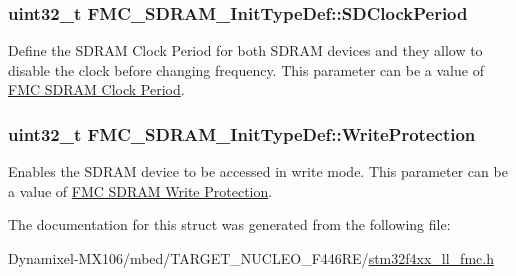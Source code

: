 \subsubsection[{\texorpdfstring{S\+D\+Clock\+Period}{SDClockPeriod}}]{\setlength{\rightskip}{0pt plus 5cm}uint32\+\_\+t F\+M\+C\+\_\+\+S\+D\+R\+A\+M\+\_\+\+Init\+Type\+Def\+::\+S\+D\+Clock\+Period}\hypertarget{struct_f_m_c___s_d_r_a_m___init_type_def_af7845a58e91f2166717b2f7f15d14dbb}{}\label{struct_f_m_c___s_d_r_a_m___init_type_def_af7845a58e91f2166717b2f7f15d14dbb}
Define the S\+D\+R\+AM Clock Period for both S\+D\+R\+AM devices and they allow to disable the clock before changing frequency. This parameter can be a value of \hyperlink{group___f_m_c___s_d_r_a_m___clock___period}{F\+MC S\+D\+R\+AM Clock Period}. 
\subsubsection[{\texorpdfstring{Write\+Protection}{WriteProtection}}]{\setlength{\rightskip}{0pt plus 5cm}uint32\+\_\+t F\+M\+C\+\_\+\+S\+D\+R\+A\+M\+\_\+\+Init\+Type\+Def\+::\+Write\+Protection}\hypertarget{struct_f_m_c___s_d_r_a_m___init_type_def_a5baf22e72bd710a0522b0814723f518d}{}\label{struct_f_m_c___s_d_r_a_m___init_type_def_a5baf22e72bd710a0522b0814723f518d}
Enables the S\+D\+R\+AM device to be accessed in write mode. This parameter can be a value of \hyperlink{group___f_m_c___s_d_r_a_m___write___protection}{F\+MC S\+D\+R\+AM Write Protection}. 

The documentation for this struct was generated from the following file\+:\begin{DoxyCompactItemize}
\item 
Dynamixel-\/\+M\+X106/mbed/\+T\+A\+R\+G\+E\+T\+\_\+\+N\+U\+C\+L\+E\+O\+\_\+\+F446\+R\+E/\hyperlink{stm32f4xx__ll__fmc_8h}{stm32f4xx\+\_\+ll\+\_\+fmc.\+h}\end{DoxyCompactItemize}
